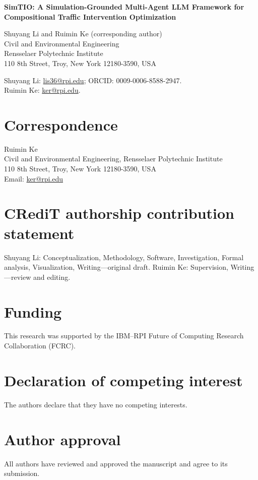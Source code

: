\documentclass[11pt]{article}
\begin{document}
\begin{center}
{\Large\bfseries SimTIO: A Simulation-Grounded Multi-Agent LLM Framework for Compositional Traffic Intervention Optimization\par}
\vspace{1.5em}
Shuyang Li and Ruimin Ke (corresponding author)\\[1em]
Civil and Environmental Engineering\\
Rensselaer Polytechnic Institute\\
110 8th Street, Troy, New York 12180-3590, USA
\end{center}
\vspace{1em}
\noindent Shuyang Li: \href{mailto:lis36@rpi.edu}{lis36@rpi.edu}; ORCID: 0009-0006-8588-2947.\\
Ruimin Ke: \href{mailto:ker@rpi.edu}{ker@rpi.edu}.

\section*{Correspondence}
Ruimin Ke\\
Civil and Environmental Engineering, Rensselaer Polytechnic Institute\\
110 8th Street, Troy, New York 12180-3590, USA\\
Email: \href{mailto:ker@rpi.edu}{ker@rpi.edu}

\section*{CRediT authorship contribution statement}
Shuyang Li: Conceptualization, Methodology, Software, Investigation, Formal analysis, Visualization, Writing---original draft. Ruimin Ke: Supervision, Writing---review and editing.

\section*{Funding}
This research was supported by the IBM--RPI Future of Computing Research Collaboration (FCRC).

\section*{Declaration of competing interest}
The authors declare that they have no competing interests.

\section*{Author approval}
All authors have reviewed and approved the manuscript and agree to its submission.
\end{document}
